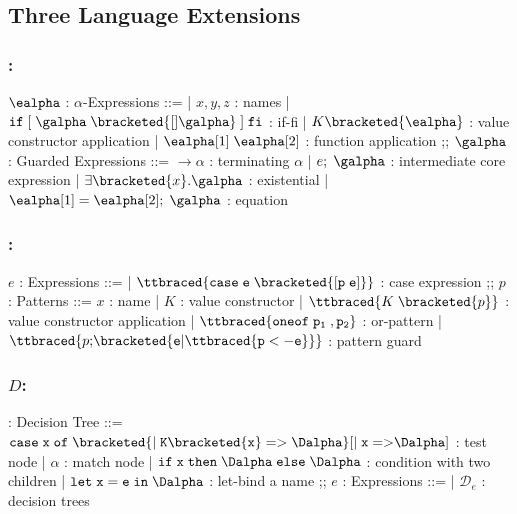 \documentclass[]{article}
\begin{document}
\subsection{Three Language Extensions}

\subsubsection{\Vminus:}

\begin{center}
    \begin{bnf}
    $\ealpha$ : \textsf{$\alpha$-Expressions} ::=
    | $x, y, z$ : names
    | $\tt{if} \; \tt{[}\; \galpha \; \bracketed{[] \galpha} \;\tt{]} \; \tt{fi}$ : if-fi 
    | $K \bracketed{\ealpha}$ : value constructor application 
    | $\ealpha[1] \; \ealpha[2]$ : function application 
    ;;
    $\galpha$ : \textsf{Guarded Expressions} ::=  
    $\boldsymbol{\rightarrow}\alpha$ : terminating $\alpha$ 
    | $e; \; \galpha$ : intermediate core expression 
    | $\exists \bracketed{x} \tt{.} \galpha$ : existential 
    | $\ealpha[1] = \ealpha[2]; \; \galpha$ : equation 
    \end{bnf}
\end{center}

\bigskip 

\subsubsection{\Pplus:}
\begin{center}
    \begin{bnf}
$e$ : \textsf{Expressions} ::=
    | $\ttbraced{\tt{case} \; e \; \bracketed{\tt{[} p \; e \tt{]}}}$ : case expression 
    ;;
    $p$ : \textsf{Patterns} ::= $x$ : name 
    | $K$ : value constructor 
    | $\ttbraced{K \; \bracketed{p}}$ : value constructor application 
    | $\ttbraced{\tt{oneof} \; p_{1} \;, p_{2} }$ : or-pattern 
    | $\ttbraced{p \tt{;} \bracketed{e \vert \ttbraced{p  <- e}}}$ : pattern guard
    \end{bnf}
\end{center}


\bigskip 

\subsubsection{$D$:}

\begin{center}
    \begin{bnf}
        \Dalpha : \textsf{Decision Tree} ::= 
        $\tt{case} \; x \; \tt{of} \; 
        \bracketed{\vert \; K\bracketed{x} \; \tt{=>} \; \Dalpha}
        [\vert \; x \; \tt{=>} \Dalpha]$ : test node 
        | $\alpha$ : match node 
        | $\tt{if} \; x \; \tt{then} \; \Dalpha \; \tt{else} \; \Dalpha$ : condition with two children 
        | $\tt{let} \; x \; \tt{=} \; e \; \tt{in} \; \Dalpha$ : let-bind a name
        ;;
        $e$ : \textsf{Expressions} ::=
        | $\mathcal{D}_{e}$ : decision trees 
    \end{bnf}
\end{center}
\end{document}
